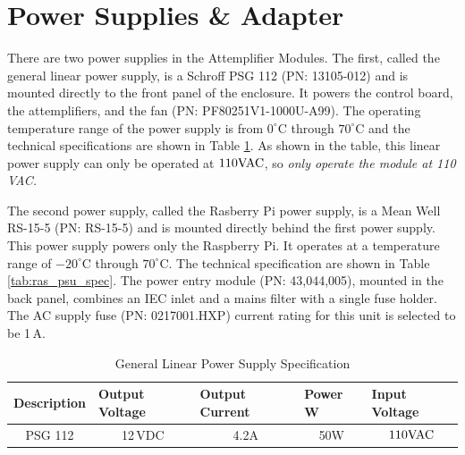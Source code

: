 \documentclass[12pt,a4paper,oneside]{article}
\begin{document}
\section{Power Supplies \& Adapter}
\label{sec:6}

There are two power supplies in the Attemplifier Modules. The first, called the general linear power supply, is a Schroff PSG 112 (PN: 13105-012) and is mounted directly to the front panel of the enclosure. It powers the control board, the attemplifiers, and the fan (PN: PF80251V1-1000U-A99). The operating temperature range of the power supply is from $0^{\circ}$C through $70^{\circ}$C and the technical specifications are shown in Table \ref{tab:gen_psu_spec}. As shown in the table, this linear power supply can only be operated at $110 \rm{VAC}$, so \emph{only operate the module at 110 VAC.}

The second power supply, called the Rasberry Pi power supply, is a Mean Well RS-15-5 (PN: RS-15-5) and is mounted directly behind the first power supply. This power supply powers only the Raspberry Pi. It operates at a temperature range of $-20^{\circ}$C through $70^{\circ}$C. The technical specification are shown in Table \ref{tab:ras_psu_spec}. The power entry module (PN: 43,044,005), mounted in the back panel, combines an IEC inlet and a mains filter with a single fuse holder. The AC supply fuse (PN: 0217001.HXP) current rating for this unit is selected to be 1\,A. 

\begin{table}[H]
\centering
\caption{General Linear Power Supply Specification}
\label{tab:gen_psu_spec}
\begin{tabular}{@{}ccccc@{}}
\toprule
\multicolumn{1}{l}{Description} & \multicolumn{1}{l}{Output Voltage} & \multicolumn{1}{l}{Output Current} & \multicolumn{1}{l}{Power W} & \multicolumn{1}{l}{Input Voltage} \\ \midrule
PSG 112                        & 12\,VDC                               & 4.2A                               & 50W                         & $110\rm{VAC}$                              \\ \bottomrule
\end{tabular}
\end{table}
\end{document}
